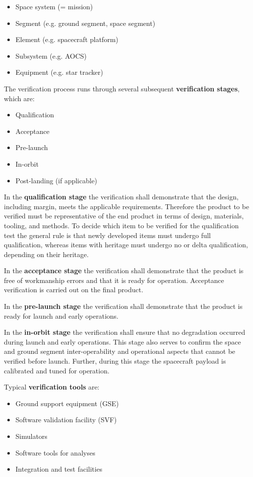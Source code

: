 \begin{itemize}
\item Space system (= mission)
\item Segment (e.g. ground segment, space segment)
\item Element (e.g. spacecraft platform)
\item Subsystem (e.g. AOCS)
\item Equipment (e.g. star tracker)
\end{itemize}

The verification process runs through several subsequent \textbf{verification stages}, which are:

\begin{itemize}
\item Qualification
\item Acceptance 
\item Pre-launch
\item In-orbit
\item Post-landing (if applicable)
\end{itemize}

In the \textbf{qualification stage} the verification shall demonstrate that the design, including margin, meets the applicable requirements. Therefore the product to be verified must be representative of the end product in terms of design, materials, tooling, and methods. To decide which item to be verified for the qualification test the general rule is that newly developed items must undergo full qualification, whereas items with heritage must undergo no or delta qualification, depending on their heritage.

In the \textbf{acceptance stage} the verification shall demonstrate that the product is free of workmanship errors and that it is ready for operation. Acceptance verification is carried out on the final product. 

In the \textbf{pre-launch stage} the verification shall demonstrate that the product is ready for launch and early operations.

In the \textbf{in-orbit stage} the verification shall ensure that no degradation occurred during launch and early operations. This stage also serves to confirm the space and ground segment inter-operability and operational aspects that cannot be verified before launch. Further, during this stage the spacecraft payload is calibrated and tuned for operation.

Typical \textbf{verification tools} are: 

\begin{itemize}
\item Ground support equipment (GSE)
\item Software validation facility (SVF)
\item Simulators
\item Software tools for analyses
\item Integration and test facilities
\end{itemize}

